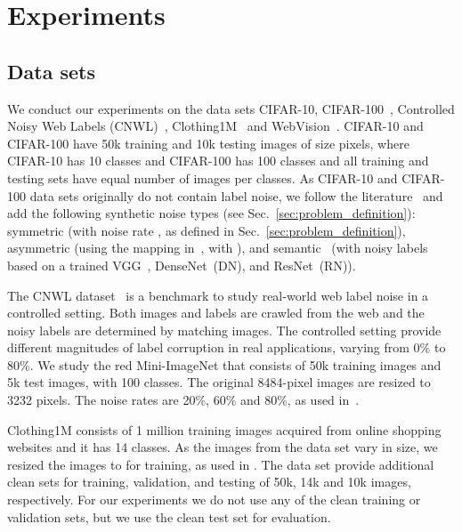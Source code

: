 \documentclass{bmvc2k}
\begin{document}
\vspace{-.1in}
\section{Experiments}

\subsection{Data sets}

We conduct our experiments on the data sets  CIFAR-10, CIFAR-100~\citep{krizhevsky2009learning}, Controlled Noisy Web Labels (CNWL)~\citep{jiang2020beyond}, Clothing1M~\citep{xiao2015learning}  and  WebVision~\citep{webvision}. CIFAR-10 and CIFAR-100 have 50k training and 10k testing images of size  pixels, where CIFAR-10 has 10 classes and CIFAR-100 has 100 classes and all training and testing sets have equal number of images per classes. 
As CIFAR-10 and CIFAR-100 data sets originally do not contain label noise, we follow the literature~\citep{DivideMix} and add  the following synthetic noise types (see Sec.~\ref{sec:problem_definition}): symmetric (with noise rate , as defined in Sec.~\ref{sec:problem_definition}), asymmetric (using the mapping  in~\citep{DivideMix, patrini2017making}, with ), and semantic~\citep{rog} (with noisy labels based on a trained VGG~\citep{vgg}, DenseNet~(DN), and ResNet~(RN)). 

 The CNWL dataset~\citep{jiang2020beyond} is a benchmark to study real-world web label noise in a controlled setting. Both images and labels are crawled from the web and the noisy labels are determined by matching images. The controlled setting provide different magnitudes of label corruption in real applications, varying from 0\% to 80\%. We study the red Mini-ImageNet that consists of 50k training images and 5k test images, with 100 classes. 
 The original 8484-pixel images are resized to 3232 pixels. 
 The noise rates are 20\%, 60\% and 80\%, as used in~\citep{FaMUS}.
 
 Clothing1M consists of 1 million training images acquired from online shopping websites and it has 14 classes.
As the images from the data set vary in size, we resized the images to  for training, as used in \cite{DivideMix,han2019deep}.
The data set provide additional clean sets for 
training, validation, and testing of 50k, 14k and 10k images, respectively. For our experiments we do not use any of the clean training or validation sets, but we use the clean test set for evaluation.
 
\end{document}
